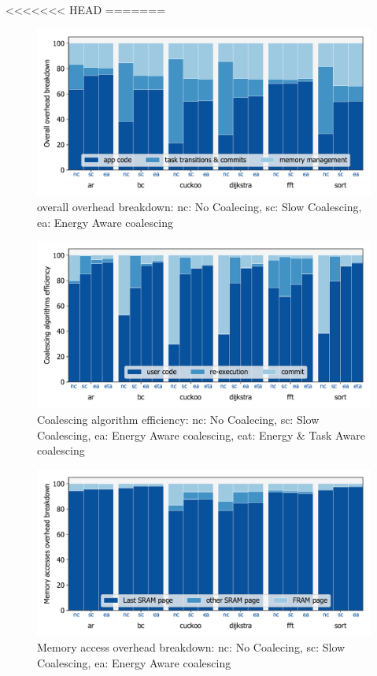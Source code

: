 <<<<<<< HEAD
=======
\begin{figure}
	\centering
	\includegraphics[width=\columnwidth]{figures/overallOverhead}
	\caption{ overall overhead breakdown: nc: No Coalecing, sc: Slow Coalescing, ea: Energy Aware coalescing }
	\label{fig:overallOverheadBreakdown}
\end{figure}


\begin{figure}
	\centering
	\includegraphics[width=\columnwidth]{figures/coalEfficiency}
	\caption{ Coalescing algorithm efficiency:  nc: No Coalecing, sc: Slow Coalescing, ea: Energy Aware coalescing, eat: Energy \& Task Aware coalescing }
	\label{fig:coalEfficiency}
\end{figure}

\begin{figure}
	\centering
	\includegraphics[width=\columnwidth]{figures/memAccess}
	\caption{ Memory access overhead breakdown:  nc: No Coalecing, sc: Slow Coalescing, ea: Energy Aware coalescing }
	\label{fig:coalEfficiency}
\end{figure}

